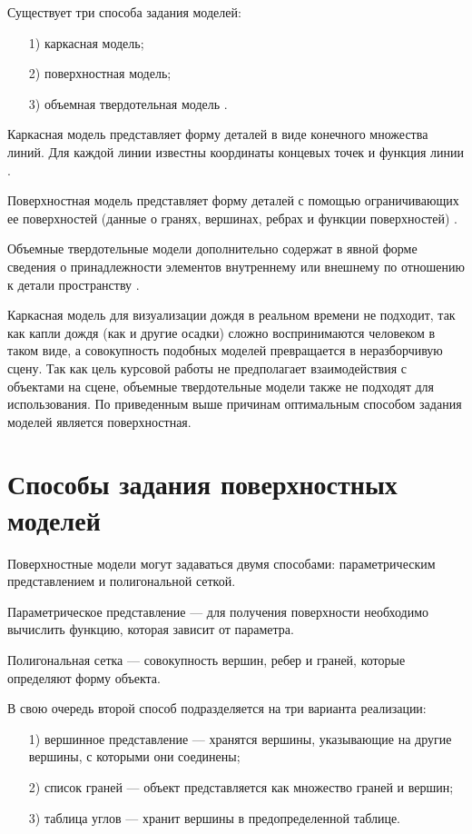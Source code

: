 Существует три способа задания моделей:

\begin{enumerate}
\item[1)]
каркасная модель;
\item[2)]
поверхностная модель;
\item[3)]
объемная твердотельная модель \cite{Kuritsina2011}.
\end{enumerate}

Каркасная модель представляет форму деталей в виде конечного множества линий. Для каждой линии известны координаты концевых точек и функция линии \cite{Kuritsina2011}.

Поверхностная модель представляет форму деталей с помощью ограничивающих ее поверхностей (данные о гранях, вершинах, ребрах и функции поверхностей) \cite{Kuritsina2011}.

Объемные твердотельные модели дополнительно содержат в явной форме сведения о принадлежности элементов внутреннему или внешнему по отношению к детали пространству \cite{Kuritsina2011}.

Каркасная модель для визуализации дождя в реальном времени не подходит, так как капли дождя (как и другие осадки) сложно воспринимаются человеком в таком виде, а совокупность подобных моделей превращается в неразборчивую сцену. 
Так как цель курсовой работы не предполагает взаимодействия с объектами на сцене, объемные твердотельные модели также не подходят для использования. 
По приведенным выше причинам оптимальным способом задания моделей является поверхностная.

\section{Способы задания поверхностных моделей}

Поверхностные модели могут задаваться двумя способами: параметрическим представлением и полигональной сеткой.

Параметрическое представление --- для получения поверхности необходимо вычислить функцию, которая зависит от параметра.

Полигональная сетка --- совокупность вершин, ребер и граней, которые определяют форму объекта.

В свою очередь второй способ подразделяется на три варианта реализации:

\begin{enumerate}
\item[1)]
вершинное представление --- хранятся вершины, указывающие на другие вершины, с которыми они соединены;
\item[2)]
список граней --- объект представляется как множество граней и вершин;
\item[3)]
таблица углов --- хранит вершины в предопределенной таблице.
\end{enumerate}

